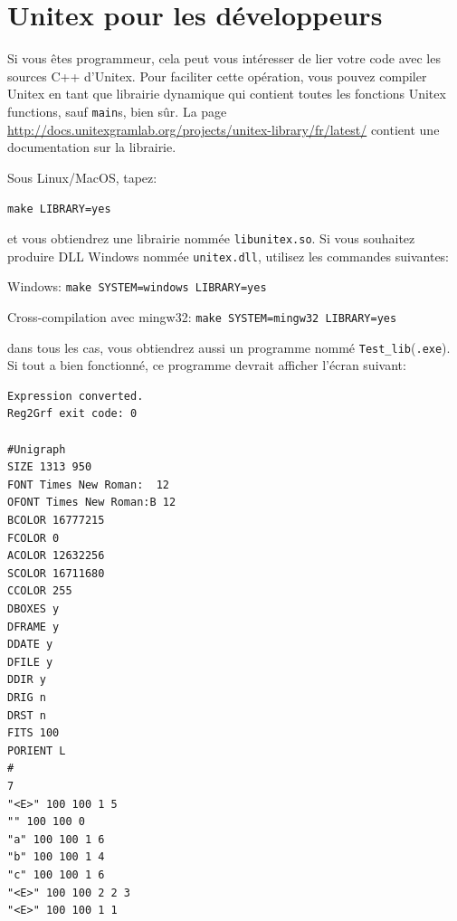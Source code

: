 \section{Unitex pour les développeurs}
\label{section-unitex-developpers}
Si vous êtes programmeur, cela peut vous intéresser de lier votre code avec les sources C++
d'Unitex. Pour faciliter cette opération, vous pouvez compiler Unitex en tant que librairie
dynamique qui contient toutes les fonctions Unitex functions, sauf \verb+main+s, bien sûr. La
page \url{http://docs.unitexgramlab.org/projects/unitex-library/fr/latest/} contient une documentation sur la librairie.


\bigskip
Sous Linux/MacOS, tapez:

\bigskip
\verb+make LIBRARY=yes+

\bigskip
\noindent et vous obtiendrez une librairie nommée \verb+libunitex.so+. Si vous souhaitez produire 
DLL Windows nommée \verb+unitex.dll+, utilisez les commandes suivantes:

\bigskip
Windows: \verb+make SYSTEM=windows LIBRARY=yes+

Cross-compilation avec mingw32: \verb+make SYSTEM=mingw32 LIBRARY=yes+

\bigskip
\noindent dans tous les cas, vous obtiendrez aussi un programme nommé
\verb+Test_lib+(\verb+.exe+). Si tout a bien fonctionné, ce programme devrait afficher l'écran
suivant:

\begin{verbatim}
Expression converted.
Reg2Grf exit code: 0

#Unigraph
SIZE 1313 950
FONT Times New Roman:  12
OFONT Times New Roman:B 12
BCOLOR 16777215
FCOLOR 0
ACOLOR 12632256
SCOLOR 16711680
CCOLOR 255
DBOXES y
DFRAME y
DDATE y
DFILE y
DDIR y
DRIG n
DRST n
FITS 100
PORIENT L
#
7
"<E>" 100 100 1 5
"" 100 100 0
"a" 100 100 1 6
"b" 100 100 1 4
"c" 100 100 1 6
"<E>" 100 100 2 2 3
"<E>" 100 100 1 1
\end{verbatim}
